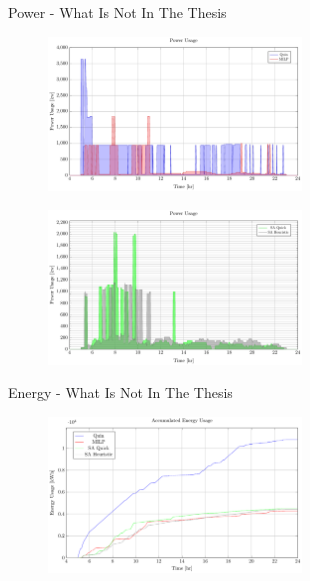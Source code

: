 \documentclass[bigger]{beamer}
\begin{document}
\begin{frame}[label={sec:org5d50060}]{Power - What Is Not In The Thesis}
\begin{figure}[htpb]
\centering
    \includegraphics[width=0.6\textwidth]{img/sa-pap-paper-good/power-milp-qin}
\end{figure}
\begin{figure}[htpb]
\centering
    \includegraphics[width=0.6\textwidth]{img/sa-pap-paper-good/power-sa}
\end{figure}
\end{frame}
\begin{frame}[label={sec:orgcb28c15}]{Energy - What Is Not In The Thesis}
\begin{figure}[htpb]
\centering
    \includegraphics[width=0.6\textwidth]{img/sa-pap-paper-good/energy}
\end{figure}
\end{frame}
\end{document}
